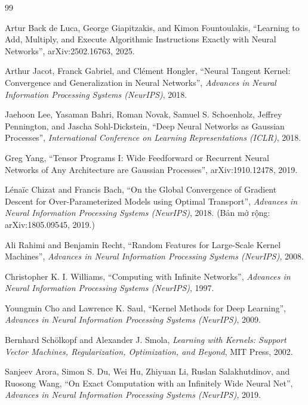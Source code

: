 \begin{thebibliography}{99}

     Artur Back de Luca, George Giapitzakis, and Kimon Fountoulakis, ``Learning to Add, Multiply, and Execute Algorithmic Instructions Exactly with Neural Networks'', arXiv:2502.16763, 2025.

     Arthur Jacot, Franck Gabriel, and Cl\'ement Hongler, ``Neural Tangent Kernel: Convergence and Generalization in Neural Networks'', \emph{Advances in Neural Information Processing Systems (NeurIPS)}, 2018.

     Jaehoon Lee, Yasaman Bahri, Roman Novak, Samuel S. Schoenholz, Jeffrey Pennington, and Jascha Sohl-Dickstein, ``Deep Neural Networks as Gaussian Processes'', \emph{International Conference on Learning Representations (ICLR)}, 2018.

     Greg Yang, ``Tensor Programs I: Wide Feedforward or Recurrent Neural Networks of Any Architecture are Gaussian Processes'', arXiv:1910.12478, 2019.

     L\'ena\"ic Chizat and Francis Bach, ``On the Global Convergence of Gradient Descent for Over-Parameterized Models using Optimal Transport'', \emph{Advances in Neural Information Processing Systems (NeurIPS)}, 2018. (Bản mở rộng: arXiv:1805.09545, 2019.)

     Ali Rahimi and Benjamin Recht, ``Random Features for Large-Scale Kernel Machines'', \emph{Advances in Neural Information Processing Systems (NeurIPS)}, 2008.

     Christopher K. I. Williams, ``Computing with Infinite Networks'', \emph{Advances in Neural Information Processing Systems (NeurIPS)}, 1997.

     Youngmin Cho and Lawrence K. Saul, ``Kernel Methods for Deep Learning'', \emph{Advances in Neural Information Processing Systems (NeurIPS)}, 2009.

     Bernhard Sch\"olkopf and Alexander J. Smola, \emph{Learning with Kernels: Support Vector Machines, Regularization, Optimization, and Beyond}, MIT Press, 2002.

     Sanjeev Arora, Simon S. Du, Wei Hu, Zhiyuan Li, Ruslan Salakhutdinov, and Ruosong Wang, ``On Exact Computation with an Infinitely Wide Neural Net'', \emph{Advances in Neural Information Processing Systems (NeurIPS)}, 2019.


\end{thebibliography}
